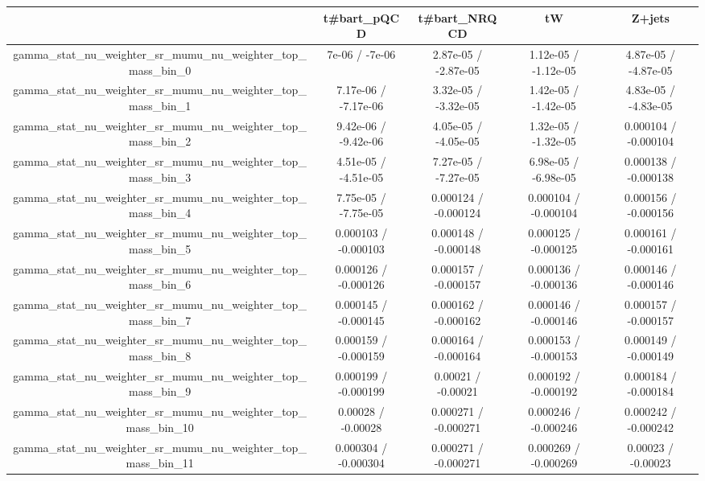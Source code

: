 \documentclass[10pt]{article}
\begin{document}
\begin{table}[htbp]
\begin{center}
\begin{tabular}{|c|c|c|c|c|}
\hline 
      & t#bar{t}_{pQCD}      & t#bar{t}_{NRQCD}      & tW      & Z+jets \\ 
\hline 
  gamma_stat_nu_weighter_sr_mumu_nu_weighter_top_mass_bin_0 & 7e-06 / -7e-06 & 2.87e-05 / -2.87e-05 & 1.12e-05 / -1.12e-05 & 4.87e-05 / -4.87e-05 \\ 
  gamma_stat_nu_weighter_sr_mumu_nu_weighter_top_mass_bin_1 & 7.17e-06 / -7.17e-06 & 3.32e-05 / -3.32e-05 & 1.42e-05 / -1.42e-05 & 4.83e-05 / -4.83e-05 \\ 
  gamma_stat_nu_weighter_sr_mumu_nu_weighter_top_mass_bin_2 & 9.42e-06 / -9.42e-06 & 4.05e-05 / -4.05e-05 & 1.32e-05 / -1.32e-05 & 0.000104 / -0.000104 \\ 
  gamma_stat_nu_weighter_sr_mumu_nu_weighter_top_mass_bin_3 & 4.51e-05 / -4.51e-05 & 7.27e-05 / -7.27e-05 & 6.98e-05 / -6.98e-05 & 0.000138 / -0.000138 \\ 
  gamma_stat_nu_weighter_sr_mumu_nu_weighter_top_mass_bin_4 & 7.75e-05 / -7.75e-05 & 0.000124 / -0.000124 & 0.000104 / -0.000104 & 0.000156 / -0.000156 \\ 
  gamma_stat_nu_weighter_sr_mumu_nu_weighter_top_mass_bin_5 & 0.000103 / -0.000103 & 0.000148 / -0.000148 & 0.000125 / -0.000125 & 0.000161 / -0.000161 \\ 
  gamma_stat_nu_weighter_sr_mumu_nu_weighter_top_mass_bin_6 & 0.000126 / -0.000126 & 0.000157 / -0.000157 & 0.000136 / -0.000136 & 0.000146 / -0.000146 \\ 
  gamma_stat_nu_weighter_sr_mumu_nu_weighter_top_mass_bin_7 & 0.000145 / -0.000145 & 0.000162 / -0.000162 & 0.000146 / -0.000146 & 0.000157 / -0.000157 \\ 
  gamma_stat_nu_weighter_sr_mumu_nu_weighter_top_mass_bin_8 & 0.000159 / -0.000159 & 0.000164 / -0.000164 & 0.000153 / -0.000153 & 0.000149 / -0.000149 \\ 
  gamma_stat_nu_weighter_sr_mumu_nu_weighter_top_mass_bin_9 & 0.000199 / -0.000199 & 0.00021 / -0.00021 & 0.000192 / -0.000192 & 0.000184 / -0.000184 \\ 
  gamma_stat_nu_weighter_sr_mumu_nu_weighter_top_mass_bin_10 & 0.00028 / -0.00028 & 0.000271 / -0.000271 & 0.000246 / -0.000246 & 0.000242 / -0.000242 \\ 
  gamma_stat_nu_weighter_sr_mumu_nu_weighter_top_mass_bin_11 & 0.000304 / -0.000304 & 0.000271 / -0.000271 & 0.000269 / -0.000269 & 0.00023 / -0.00023 \\ 

\end{tabular}
\end{center}
\end{table}
\end{document}
